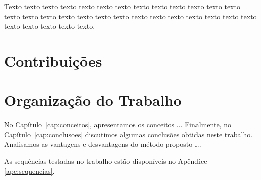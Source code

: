 Texto texto texto texto texto texto texto texto texto texto texto texto texto
texto texto texto texto texto texto texto texto texto texto texto texto texto
texto texto texto texto texto texto.

\section{Contribuições}
\label{sec:contribucoes}



\section{Organização do Trabalho}
\label{sec:organizacao_trabalho}

No Capítulo~\ref{cap:conceitos}, apresentamos os conceitos ... Finalmente, no
Capítulo~\ref{cap:conclusoes} discutimos algumas conclusões obtidas neste
trabalho. Analisamos as vantagens e desvantagens do método proposto ... 

As sequências testadas no trabalho estão disponíveis no Apêndice \ref{ape:sequencias}.
